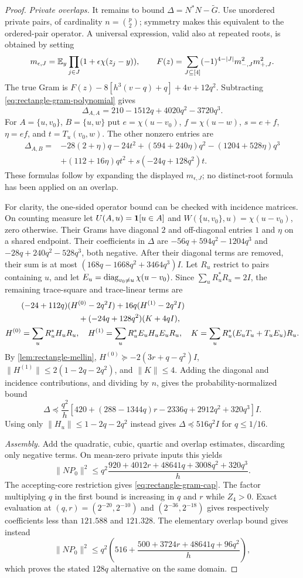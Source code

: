 \begin{proof}
\emph{Private overlaps.}
It remains to bound $\Delta=N^*N-\widetilde G$. Use unordered
private pairs, of cardinality $n=\binom p2$; symmetry makes this
equivalent to the ordered-pair operator. A universal expression,
valid also at repeated roots, is obtained by setting
\[
 m_{\epsilon,J}=\mathbb E_y\prod_{j\in J}(1+\epsilon\chi(z_j-y)),\qquad
 F(z)=\sum_{J\subseteq[4]}(-1)^{4-|J|}m_{-,J}^2m_{+,J}^2.
\]
The true Gram is $F(z)-8[h^3(v-q)+q]+4v+12q^2$.
Subtracting \eqref{eq:rectangle-gram-polynomial} gives
\[
 \Delta_{A,A}=210-1512q+4020q^2-3720q^3.
\]
For $A=\{u,v_0\}$, $B=\{u,w\}$ put
$e=\chi(u-v_0)$, $f=\chi(u-w)$, $s=e+f$, $\eta=ef$, and
$t=T_u(v_0,w)$. The other nonzero entries are
\begin{align*}
 \Delta_{A,B}={}&-28(2+\eta)q-24t^2+(594+240\eta)q^2
 -(1204+528\eta)q^3\\
 &+(112+16\eta)qt^2+s(-24q+128q^2)t.
\end{align*}
These formulas follow by expanding the displayed $m_{\epsilon,J}$;
no distinct-root formula has been applied on an overlap.

For clarity, the one-sided operator bound can be checked with
incidence matrices. On counting measure let
$U(A,u)=\mathbf 1[u\in A]$ and
$W(\{u,v_0\},u)=\chi(u-v_0)$, zero otherwise.
Their Grams have diagonal $2$ and off-diagonal entries $1$ and
$\eta$ on a shared endpoint. Their coefficients in $\Delta$ are
$-56q+594q^2-1204q^3$ and $-28q+240q^2-528q^3$, both negative.
After their diagonal terms are removed, their sum is at most
$(168q-1668q^2+3464q^3)I$.
Let $R_u$ restrict to pairs containing $u$, and let
$E_u=\operatorname{diag}_{v_0\ne u}\chi(u-v_0)$. Since $\sum_uR_u^*R_u=2I$,
the remaining trace-square and trace-linear terms are
\begin{align*}
 &(-24+112q)(H^{(0)}-2q^2I)+16q(H^{(1)}-2q^2I)\notag\\
 &\hspace{25mm}+(-24q+128q^2)(K+4qI),\\
 H^{(0)}&=\sum_uR_u^*H_uR_u,\quad
 H^{(1)}=\sum_uR_u^*E_uH_uE_uR_u,\quad
 K=\sum_uR_u^*(E_uT_u+T_uE_u)R_u.
\end{align*}
By \cref{lem:rectangle-mellin},
$H^{(0)}\succeq-2(3r+q-q^2)I$,
$\|H^{(1)}\|\le2(1-2q-2q^2)$, and $\|K\|\le4$.
Adding the diagonal and incidence contributions, and dividing by
$n$, gives the probability-normalized bound
\[
 \Delta\preceq\frac{q^2}{h}
 [420+(288-1344q)r-2336q+2912q^2+320q^3]I.
\]
Using only $\|H_u\|\le1-2q-2q^2$ instead gives
$\Delta\preceq516q^2I$ for $q\le1/16$.

\emph{Assembly.}
Add the quadratic, cubic, quartic and overlap estimates, discarding
only negative terms. On mean-zero private inputs this yields
\[
 \|NP_0\|^2\le
 q^2\frac{920+4012r+48641q+3008q^2+320q^3}{h}.
\]
The accepting-core restriction gives \eqref{eq:rectangle-gram-cap}.
The factor multiplying $q$ in the first bound is increasing in
$q$ and $r$ while $Z_4>0$.
Exact evaluation at $(q,r)=(2^{-20},2^{-10})$ and
$(2^{-36},2^{-18})$ gives respectively coefficients less than
$121.588$ and $121.328$. The elementary overlap bound gives instead
\[
 \|NP_0\|^2\le q^2\left(516+
            \frac{500+3724r+48641q+96q^2}{h}\right),
\]
which proves the stated $128q$ alternative on the same domain.
\end{proof}

